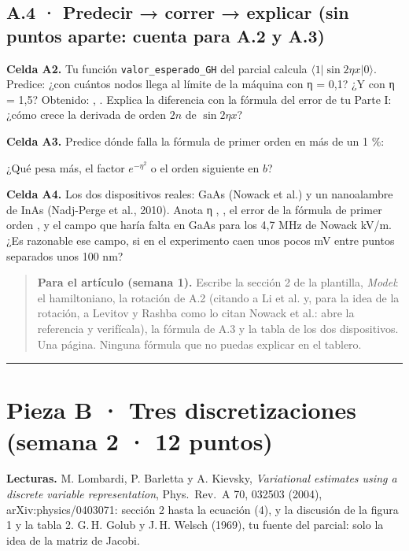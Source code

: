 
\subsection{A.4 · Predecir → correr → explicar (sin puntos aparte: cuenta para A.2 y A.3)}

\textbf{Celda A2.} Tu función \texttt{valor\_esperado\_GH} del parcial calcula $\langle 1|\sin 2\eta x|0\rangle$. Predice: ¿con cuántos nodos llega al límite de la máquina con η = 0,1?  ¿Y con η = 1,5?  Obtenido: , . Explica la diferencia con la fórmula del error de tu Parte I: ¿cómo crece la derivada de orden $2n$ de $\sin 2\eta x$?

\textbf{Celda A3.} Predice dónde falla la fórmula de primer orden en más de un 1 \%:\par{}\par ¿Qué pesa más, el factor $e^{-\eta^2}$ o el orden siguiente en $b$?\par{}

\textbf{Celda A4.} Los dos dispositivos reales: GaAs (Nowack et al.) y un nanoalambre de InAs (Nadj-Perge et al., 2010). Anota η , , el error de la fórmula de primer orden ,  y el campo que haría falta en GaAs para los 4,7 MHz de Nowack  kV/m. ¿Es razonable ese campo, si en el experimento caen unos pocos mV entre puntos separados unos 100 nm?

\begin{quote}
\textbf{Para el artículo (semana 1).} Escribe la sección 2 de la plantilla, \emph{Model}: el hamiltoniano, la rotación de A.2 (citando a Li et al. y, para la idea de la rotación, a Levitov y Rashba como lo citan Nowack et al.: abre la referencia y verifícala), la fórmula de A.3 y la tabla de los dos dispositivos. Una página. Ninguna fórmula que no puedas explicar en el tablero.
\end{quote}

\begin{center}\rule{0.5\linewidth}{0.5pt}\end{center}

\section{Pieza B · Tres discretizaciones (semana 2 · 12 puntos)}

\textbf{Lecturas.} M. Lombardi, P. Barletta y A. Kievsky, \emph{Variational estimates using a discrete variable representation}, Phys.\ Rev.\ A 70, 032503 (2004), arXiv:physics/0403071: sección 2 hasta la ecuación (4), y la discusión de la figura 1 y la tabla 2. G.\,H. Golub y J.\,H. Welsch (1969), tu fuente del parcial: solo la idea de la matriz de Jacobi.

